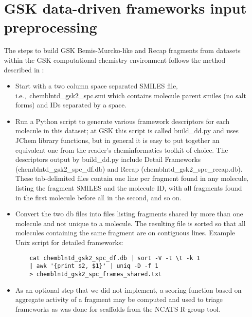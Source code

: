 \documentclass[11pt,letterpaper]{article}
\newcommand*\ie{i.e.,~}
\begin{document}
\newpage 

\section{GSK data-driven frameworks input preprocessing}
\label{sec:gskfw-prepro}

The steps to build GSK Bemis-Murcko-like and Recap fragments from datasets within the GSK computational chemistry environment follows the method described in  \cite{Harper2004DDclus}:
\begin{itemize}
\item Start with a two column space separated SMILES file, \ie chemblntd\_gsk2\_spc.smi which contains molecule parent smiles (no salt forms) and IDs separated by a space. 
\item Run a Python script to generate various framework descriptors for each molecule in this dataset; at GSK this script is called build\_dd.py and uses {JChem} library functions, but in general it is easy to put together an equivalent one from the reader's cheminformatics toolkit of choice.  The descriptors output by build\_dd.py include Detail Frameworks (chemblntd\_gsk2\_spc\_df.db) and Recap (chemblntd\_gsk2\_spc\_recap.db). These tab-delimited files contain one line per fragment found in any molecule, listing the fragment SMILES and the molecule ID, with all fragments found in the first molecule before all in the second, and so on.
\item Convert the two db files into files listing fragments shared by more than one molecule and not unique to a molecule. The resulting file is sorted so that all molecules containing the same fragment are on contiguous lines. Example Unix script for detailed frameworks:
  \begin{verbatim}
    cat chemblntd_gsk2_spc_df.db | sort -V -t \t -k 1
    | awk '{print $2, $1}' | uniq -D -f 1
    > chemblntd_gsk2_spc_frames_shared.txt
  \end{verbatim}
\item As an optional step that we did not implement, a scoring function based on aggregate activity of a fragment may be computed and used to triage frameworks as was done for scaffolds from the NCATS R-group tool.   
    
\end{itemize}

%
\end{document}
